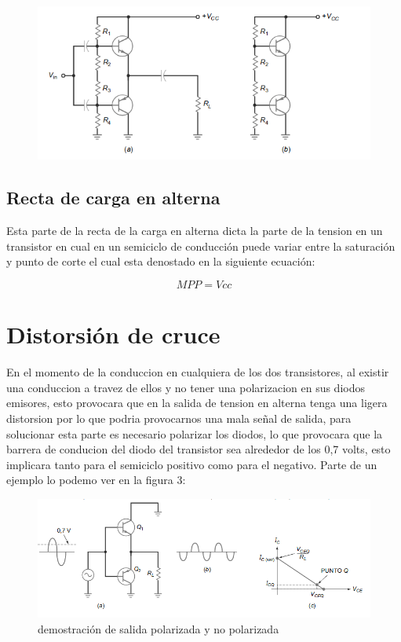 \documentclass[11pt,a4paper]{article}
\begin{document}
\begin{figure}[h]
\begin{center}
\includegraphics[scale=0.7]{3.png}
\end{center}
\end{figure}

\subsection{Recta de carga en alterna}

Esta parte de la recta de la carga en alterna dicta la parte de la tension en un transistor en cual en un semiciclo de conducción puede variar entre la saturación y punto de corte el cual esta denostado en la siguiente ecuación:

\begin{center}
\begin{equation}
MPP=Vcc
\end{equation}
\end{center}

\section{Distorsión de cruce}

En el momento de la conduccion en cualquiera de los dos transistores, al existir una conduccion a travez de ellos y no tener una polarizacion en sus diodos emisores, esto provocara que en la salida de tension en alterna tenga una ligera distorsion por lo que podria provocarnos una mala señal de salida, para solucionar esta parte es necesario polarizar los diodos, lo que provocara que la barrera de conducion del diodo del transistor sea alrededor de los 0,7 volts, esto implicara tanto para el semiciclo positivo como para el negativo. Parte de un ejemplo lo podemo ver en la figura 3:\cite{malvino1991principios}

\begin{figure}[h]
 \begin{center}
 \includegraphics[scale=0.35]{4.png}
 \caption{demostración de salida polarizada y no polarizada}
 \end{center}
\end{figure}

\newpage

 

\end{document}
